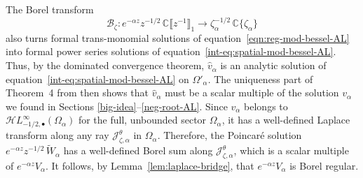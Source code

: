 \documentclass{article}
\newcommand{\singexp}[2]{\mathcal{H}L^\infty_{#1, #2}}
\newcommand{\singexpalg}[1]{\singexp{#1}{\bullet}}
\newcommand{\maps}{\colon}
\newcommand{\C}{\mathbb{C}}
\newcommand{\series}[1]{\tilde{#1}}
\newcommand{\borel}{\mathcal{B}}
\theoremstyle{definition}
\theoremstyle{plain}
\begin{document}
The Borel transform
\[ \borel_\zeta \maps e^{-\alpha z} z^{-1/2}\,\C\llbracket z^{-1} \rrbracket_1 \to \zeta_\alpha^{-1/2}\,\C\{\zeta_\alpha\} \]
also turns formal trans-monomial solutions of equation~\eqref{eqn:reg-mod-bessel-AL} into formal power series solutions of equation~\eqref{int-eq:spatial-mod-bessel-AL}. Thus, by the dominated convergence theorem, $\hat{v}_\alpha$ is an analytic solution of equation~\eqref{int-eq:spatial-mod-bessel-AL} on $\Omega'_\alpha$. The uniqueness part of Theorem~4 from \cite{reg-sing-volterra} then shows that $\hat{v}_\alpha$ must be a scalar multiple of the solution $v_\alpha$ we found in Sections \ref{big-idea}\;--\;\ref{neg-root-AL}. Since $v_\alpha$ belongs to $\singexpalg{-1/2}(\Omega_\alpha)$ for the full, unbounded sector $\Omega_\alpha$, it has a well-defined Laplace transform along any ray $\mathcal{J}^\theta_{\zeta, \alpha}$ in $\Omega_\alpha$. Therefore, the Poincar\'{e} solution $e^{-\alpha z} z^{-1/2}\,\series{W}_\alpha$ has a well-defined Borel sum along $\mathcal{J}^\theta_{\zeta, \alpha}$, which is a scalar multiple of $e^{-\alpha z} V_\alpha$. It follows, by Lemma~\ref{lem:laplace-bridge}, that $e^{-\alpha z} V_\alpha$ is Borel regular.
%
\end{document}
